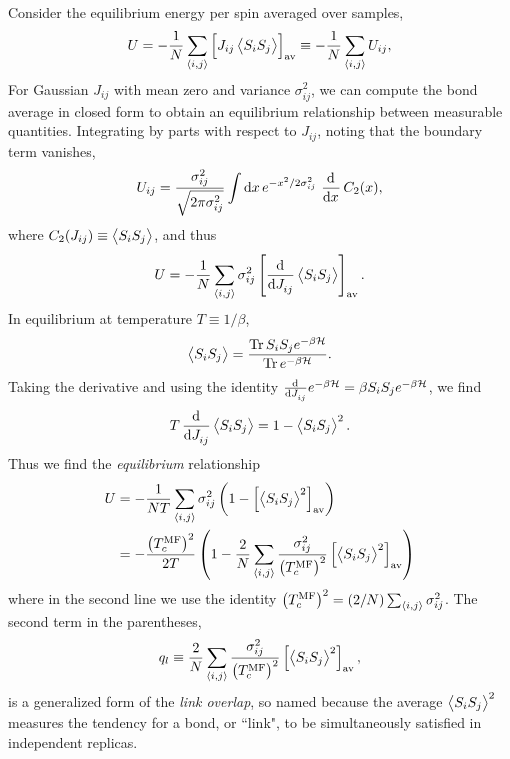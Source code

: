 Consider the equilibrium energy per spin averaged over samples,
\begin{equation}
  U =
  -\frac{1}{N} \sum_{\langle i,j \rangle} \left[J_{ij} \left< S_i S_j \right>\right]_{\mathrm{av}} \equiv
  -\frac{1}{N} \sum_{\langle i,j \rangle} U_{ij},
\end{equation}
For Gaussian $J_{ij}$ with mean zero and variance $\sigma_{ij}^2$, we can
compute the bond average in closed form to obtain an equilibrium relationship
between measurable quantities. Integrating by parts with respect to $J_{ij}$,
noting that the boundary term vanishes,
\begin{equation}
  U_{ij} =
  \frac{\sigma_{ij}^2}{\sqrt{2 \pi \sigma_{ij}^2}}
    \int \dif x \, e^{-x^2/2\sigma_{ij}^2} \, \dod{}{x} C_2(x),
\end{equation}
where $C_2(J_{ij}) \equiv \left< S_i S_j \right>$, and thus
\begin{equation}
  U = -\frac{1}{N} \sum_{\abr{i,j}} \sigma_{ij}^2 \dav{\dod{}{J_{ij}} \av{S_i S_j}}.
\end{equation}
In equilibrium at temperature $T \equiv 1/\beta$,
\begin{equation}
  \left< S_i S_j \right> = \frac{\operatorname{Tr} S_i S_j e^{-\beta \mathcal{H}}}{\operatorname{Tr} e^{-\beta \mathcal{H}}}.
\end{equation}
Taking the derivative and using the identity
$\od{}{J_{ij}} e^{-\beta \ham} = \beta S_i S_j e^{-\beta \ham}$,
we find
\begin{equation}
  T \dod{}{J_{ij}} \av{S_i S_j} =
  1 - \av{S_i S_j}^2.
\end{equation}
Thus we find the \emph{equilibrium} relationship
\begin{align}
  U
  &= - \frac{1}{NT}
       \sum_{\langle i,j \rangle}
       \sigma_{ij}^2 \left( 1 - \left[\left< S_i S_j \right>^2\right]_{\mathrm{av}} \right) \notag \\
  &= - \frac{\left(T_c^{\mathrm{MF}}\right)^2}{2T}
       \left(1 - \frac{2}{N}
       \sum_{\langle i,j \rangle} \frac{\sigma_{ij}^2}{\left(T_c^{\mathrm{MF}}\right)^2} \left[\left< S_i S_j \right>^2\right]_{\mathrm{av}}\right)
  \label{eq:equil-1}
\end{align}
where in the second line we use the identity
$\left(T_c^{\mathrm{MF}}\right)^2 = (2/N) \sum_{\langle i,j \rangle} \sigma_{ij}^2$.
The second term in the parentheses,
\begin{equation}
  q_l \equiv \frac{2}{N}
  \sum_{\langle i,j \rangle} \frac{\sigma_{ij}^2}{\left(T_c^{\mathrm{MF}}\right)^2} \left[\left< S_i S_j \right>^2\right]_{\mathrm{av}},
\end{equation}
is a generalized form of the \emph{link overlap}, so named because the average
$\left< S_i S_j \right>^2$ measures the tendency for a bond, or ``link", to be
simultaneously satisfied in independent replicas.
